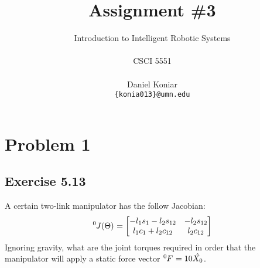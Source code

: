 \documentclass[10pt]{article}
\title{\bf Assignment \#3
}
\author{\parbox{4 in}{\centering Introduction to Intelligent Robotic Systems}\\
  CSCI 5551\\ \\
  Daniel Koniar\\
  {\tt\small \{konia013\}@umn.edu}\\
}
\begin{document}
\maketitle
\thispagestyle{empty}
\pagestyle{empty}

\section*{Problem 1} %
\subsection*{Exercise 5.13}
A certain two-link manipulator has the follow Jacobian:
\[
\tensor*[^{0}]{J(\Theta)}{} =
\begin{bmatrix}
    -l_{1}s_{1} - l_{2}s_{12}    & -l_{2}s_{12}   \\
    l_{1}c_{1}+l_{2}c_{12}      & l_{2}c_{12}
\end{bmatrix}
\]
Ignoring gravity, what are the joint torques required in order that the manipulator will apply a static force vector \(\tensor*[^{0}]{F}{} = 10 \hat{X_{0}}\).
\end{document}
